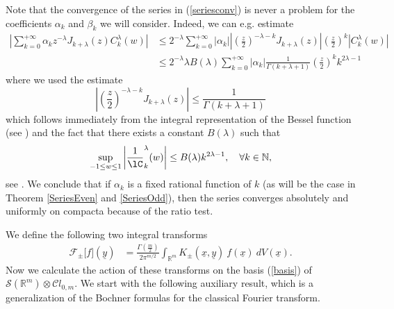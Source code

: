 \documentclass{amsart}
\theoremstyle{remark}
\begin{document}
Note that the convergence of the series in (\ref{seriesconv}) is never a problem for the coefficients ${{\alpha}}_{k}$ and $\beta_{k}$ we will consider. Indeed, we can e.g. estimate
\begin{align*}
\left| \sum_{k=0}^{+\infty} \alpha_{k}z^{-{{\lambda}}}J_{k+{{\lambda}}}(z) C^{{\lambda}}_{k}(w)\right| &\leq 2^{-{{\lambda}}} \sum_{k=0}^{+\infty} |\alpha_{k}| \left|\left(\frac{z}{2}\right)^{-{{\lambda}}-k}J_{k+{{\lambda}}}(z) \right| \left(\frac{z}{2}\right)^{k} |C^{{\lambda}}_{k}(w)| \\
& \leq 2^{-{{\lambda}}} {{\lambda}} B({{\lambda}})\sum_{k=0}^{+\infty} |\alpha_{k}| \frac{1}{\Gamma(k+{{\lambda}}+1)} \left(\frac{z}{2}\right)^{k} k^{2{{\lambda}}-1} 
\end{align*}
where we used the estimate 
\[
\left|\left(\frac{z}{2}\right)^{-{{\lambda}}-k}J_{k+{{\lambda}}}(z) \right| \leq \frac{1}{\Gamma(k+{{\lambda}}+1)}
\]
which follows immediately from the integral representation of the Bessel function (see \cite[(1.71.6)]{Sz})
and the fact that there exists a constant $B({{\lambda}})$ such that
\begin{equation*}
\sup_{-1\leq w \leq 1} \left|\frac{1}\lC_k^{{\lambda}}(w) \right| \leq B({{\lambda}}) k^{2{{\lambda}}-1}, \quad \forall k \in {\mathbb{N}},
\end{equation*}
see \cite[Lemma 4.9]{Orsted2}. We conclude that if $\alpha_{k}$ is a fixed rational function of $k$ (as will be the case in Theorem \ref{SeriesEven} and \ref{SeriesOdd}), then the series converges absolutely and uniformly on compacta because of the ratio test. 

We define the following two integral transforms
\begin{align*}
{\mathcal{F}}_{\pm}\lbrack f \rbrack ({\underline{y}}) &= \frac{\Gamma \left( \frac{m}{2} \right)}{2 \pi^{m/2}} \int_{{\mathbb{R}}^{m}}K_{\pm}({\underline{x}},{\underline{y}})\ f({\underline{x}}) \ dV({\underline{x}}).
\end{align*}
Now we calculate the action of these transforms on the basis (\ref{basis}) of ${\mathcal{S}}({\mathbb{R}}^{m}) \otimes {\mathcal{C}} l_{0,m}$. We start with the following auxiliary result, which is a generalization of the Bochner formulas for the classical Fourier transform.
\end{document}

